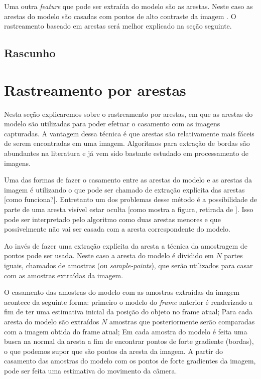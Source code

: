 Uma outra \emph{feature} que pode ser extraída do modelo são as arestas. Neste caso as arestas do modelo são casadas com pontos de alto contraste da imagem \cite{drummondecipolla}. O rastreamento baseado em arestas será melhor explicado na seção seguinte.

\subsection{Rascunho}

\section{Rastreamento por arestas}

Nesta seção explicaremos sobre o rastreamento por arestas, em que as arestas do modelo são utilizadas para poder efetuar o casamento com as imagens capturadas. A vantagem dessa técnica é que arestas são relativamente mais fáceis de serem encontradas em uma imagem. Algoritmos para extração de bordas são abundantes na literatura e já vem sido bastante estudado em processamento de imagens.%

Uma das formas de fazer o casamento entre as arestas do modelo e as arestas da imagem é utilizando o que pode ser chamado de extração explícita das arestas [como funciona?]. Entretanto um dos problemas desse método é a possibilidade de parte de uma aresta visível estar oculta [como mostra a figura, retirada de \cite{drummondecipolla}]. Isso pode ser interpretado pelo algoritmo como duas arestas menores e que possivelmente não vai ser casada com a aresta correspondente do modelo.

Ao invés de fazer uma extração explícita da aresta a técnica da amostragem de pontos pode ser usada. Neste caso a aresta do modelo é dividido em $N$ partes iguais, chamados de amostras (ou \emph{sample-points}), que serão utilizados para casar com as amostras extraídas da imagem.

O casamento das amostras do modelo com as amostras extraídas da imagem acontece da seguinte forma: primeiro o modelo do \emph{frame} anterior é renderizado a fim de ter uma estimativa inicial da posição do objeto no frame atual; Para cada aresta do modelo são extraídos $N$ amostras que posteriormente serão comparadas com a imagem obtida do frame atual; Em cada amostra do modelo é feita uma busca na normal da aresta a fim de encontrar pontos de forte gradiente (bordas), o que podemos supor que são pontos da aresta da imagem. A partir do casamento das amostras do modelo com os pontos de forte gradientes da imagem, pode ser feita uma estimativa do movimento da câmera.

